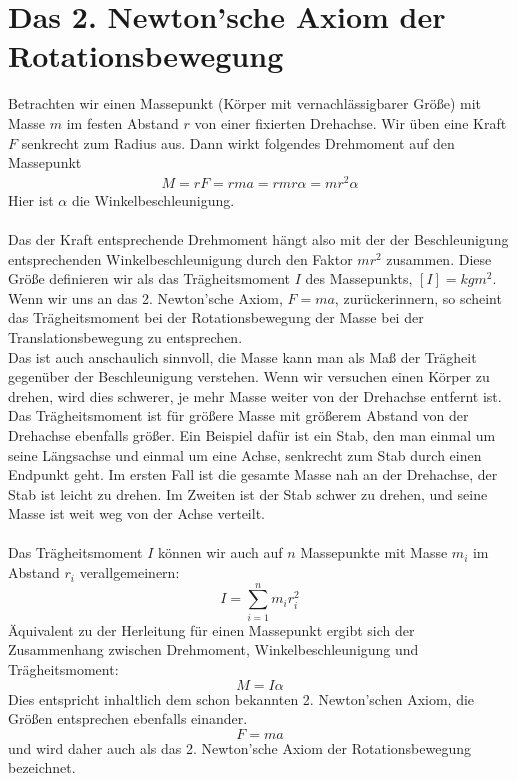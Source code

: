 \documentclass[11pt]{article}
\begin{document}
\section{Das 2. Newton'sche Axiom der Rotationsbewegung}
Betrachten wir einen Massepunkt (Körper mit vernachlässigbarer Größe) mit Masse $m$ im festen Abstand $r$ von einer fixierten Drehachse. Wir üben eine Kraft $F$ senkrecht zum Radius aus. Dann wirkt folgendes Drehmoment auf den Massepunkt
\begin{align*}
        M = rF = rma = rmr\alpha = mr^2\alpha
\end{align*}
Hier ist $\alpha$ die Winkelbeschleunigung. \\\\
Das der Kraft entsprechende Drehmoment hängt also mit der der Beschleunigung entsprechenden Winkelbeschleunigung durch den Faktor $mr^2$ zusammen. Diese Größe definieren wir als das Trägheitsmoment $I$ des Massepunkts, $[I] = kgm^2$. Wenn wir uns an das 2. Newton'sche Axiom, $F = ma$, zurückerinnern, so scheint das Trägheitsmoment bei der Rotationsbewegung der Masse bei der Translationsbewegung zu entsprechen. \\
Das ist auch anschaulich sinnvoll, die Masse kann man als Maß der Trägheit gegenüber der Beschleunigung verstehen. Wenn wir versuchen einen Körper zu drehen, wird dies schwerer, je mehr Masse weiter von der Drehachse entfernt ist. Das Trägheitsmoment ist für größere Masse mit größerem Abstand von der Drehachse ebenfalls größer. Ein Beispiel dafür ist ein Stab, den man einmal um seine Längsachse und einmal um eine Achse, senkrecht zum Stab durch einen Endpunkt geht. Im ersten Fall ist die gesamte Masse nah an der Drehachse, der Stab ist leicht zu drehen. Im Zweiten ist der Stab schwer zu drehen, und seine Masse ist weit weg von der Achse verteilt. \\\\
Das Trägheitsmoment $I$ können wir auch auf $n$ Massepunkte mit Masse $m_i$ im Abstand $r_i$ verallgemeinern:
\begin{equation*}
        I = \sum_{i=1}^n m_ir_i^2
\end{equation*}
Äquivalent zu der Herleitung für einen Massepunkt ergibt sich der Zusammenhang zwischen Drehmoment, Winkelbeschleunigung und Trägheitsmoment: 
\begin{equation*}
        M = I\alpha
\end{equation*}
Dies entspricht inhaltlich dem schon bekannten 2. Newton'schen Axiom, die Größen entsprechen ebenfalls einander.  
\begin{equation*}
        F = ma
\end{equation*}
und wird daher auch als das 2. Newton'sche Axiom der Rotationsbewegung bezeichnet. 
\end{document}
